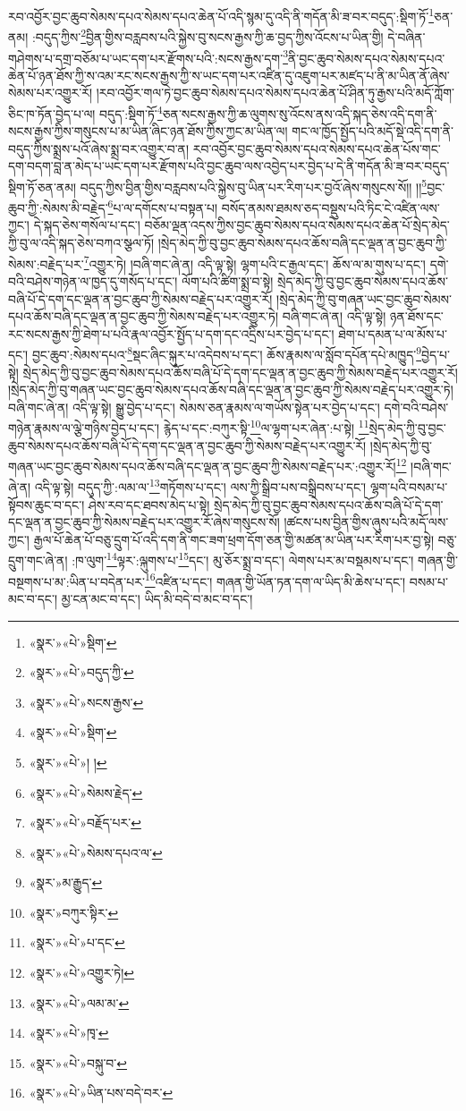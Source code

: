 རབ་འབྱོར་བྱང་ཆུབ་སེམས་དཔའ་སེམས་དཔའ་ཆེན་པོ་འདི་སྙམ་དུ་འདི་ནི་གདོན་མི་ཟ་བར་བདུད་:སྡིག་ཏོ་\footnote{«སྣར་»«པེ་»སྡིག་}ཅན་ནམ། :བདུད་ཀྱིས་\footnote{«སྣར་»«པེ་»བདུད་ཀྱི་}བྱིན་གྱིས་བརླབས་པའི་སྐྱེས་བུ་སངས་རྒྱས་ཀྱི་ཆ་བྱད་ཀྱིས་འོངས་པ་ཡིན་གྱི། དེ་བཞིན་གཤེགས་པ་དགྲ་བཅོམ་པ་ཡང་དག་པར་རྫོགས་པའི་:སངས་རྒྱས་དག་\footnote{«སྣར་»«པེ་»སངས་རྒྱས་}ནི་བྱང་ཆུབ་སེམས་དཔའ་སེམས་དཔའ་ཆེན་པོ་ཉན་ཐོས་ཀྱི་ས་འམ་རང་སངས་རྒྱས་ཀྱི་ས་ཡང་དག་པར་འཛིན་དུ་འཇུག་པར་མཛད་པ་ནི་མ་ཡིན་ནོ་ཞེས་སེམས་པར་འགྱུར་རོ། །རབ་འབྱོར་གལ་ཏེ་བྱང་ཆུབ་སེམས་དཔའ་སེམས་དཔའ་ཆེན་པོ་ཤིན་ཏུ་རྒྱས་པའི་མདོ་ཀློག་ཅིང་ཁ་ཏོན་བྱེད་པ་ལ། བདུད་:སྡིག་ཏོ་\footnote{«སྣར་»«པེ་»སྡིག་}ཅན་སངས་རྒྱས་ཀྱི་ཆ་ལུགས་སུ་འོངས་ནས་འདི་སྐད་ཅེས་འདི་དག་ནི་སངས་རྒྱས་ཀྱིས་གསུངས་པ་མ་ཡིན་ཞིང་ཉན་ཐོས་ཀྱིས་ཀྱང་མ་ཡིན་ལ། གང་ལ་ཁྱོད་སྤྱོད་པའི་མདོ་སྡེ་འདི་དག་ནི་བདུད་ཀྱིས་སྨྲས་པའོ་ཞེས་སྨྲ་བར་འགྱུར་བ་ན། རབ་འབྱོར་བྱང་ཆུབ་སེམས་དཔའ་སེམས་དཔའ་ཆེན་པོས་གང་དག་བདག་བླ་ན་མེད་པ་ཡང་དག་པར་རྫོགས་པའི་བྱང་ཆུབ་ལས་འབྱེད་པར་བྱེད་པ་དེ་ནི་གདོན་མི་ཟ་བར་བདུད་སྡིག་ཏོ་ཅན་ནམ། བདུད་ཀྱིས་བྱིན་གྱིས་བརླབས་པའི་སྐྱེས་བུ་ཡིན་པར་རིག་པར་བྱའོ་ཞེས་གསུངས་སོ།། །།\footnote{«སྣར་»«པེ་»། །}བྱང་ཆུབ་ཀྱི་:སེམས་མི་བརྗེད་\footnote{«སྣར་»«པེ་»སེམས་རྗེད་}པ་ལ་དགོངས་པ་བསྟན་པ། བསོད་ནམས་ཐམས་ཅད་བསྡུས་པའི་ཏིང་ངེ་འཛིན་ལས་ཀྱང་། དེ་སྐད་ཅེས་གསོལ་པ་དང་། བཅོམ་ལྡན་འདས་ཀྱིས་བྱང་ཆུབ་སེམས་དཔའ་སེམས་དཔའ་ཆེན་པོ་སྲེད་མེད་ཀྱི་བུ་ལ་འདི་སྐད་ཅེས་བཀའ་སྩལ་ཏོ། །སྲེད་མེད་ཀྱི་བུ་བྱང་ཆུབ་སེམས་དཔའ་ཆོས་བཞི་དང་ལྡན་ན་བྱང་ཆུབ་ཀྱི་སེམས་:བརྗེད་པར་\footnote{«སྣར་»«པེ་»བརྗོད་པར་}འགྱུར་ཏེ། །བཞི་གང་ཞེ་ན། འདི་ལྟ་སྟེ། ལྷག་པའི་ང་རྒྱལ་དང་། ཆོས་ལ་མ་གུས་པ་དང་། དགེ་བའི་བཤེས་གཉེན་ལ་ཁྱད་དུ་གསོད་པ་དང་། ལོག་པའི་ཚིག་སྨྲ་བ་སྟེ། སྲེད་མེད་ཀྱི་བུ་བྱང་ཆུབ་སེམས་དཔའ་ཆོས་བཞི་པོ་དེ་དག་དང་ལྡན་ན་བྱང་ཆུབ་ཀྱི་སེམས་བརྗེད་པར་འགྱུར་རོ། །སྲེད་མེད་ཀྱི་བུ་གཞན་ཡང་བྱང་ཆུབ་སེམས་དཔའ་ཆོས་བཞི་དང་ལྡན་ན་བྱང་ཆུབ་ཀྱི་སེམས་བརྗེད་པར་འགྱུར་ཏེ། བཞི་གང་ཞེ་ན། འདི་ལྟ་སྟེ། ཉན་ཐོས་དང་རང་སངས་རྒྱས་ཀྱི་ཐེག་པ་པའི་རྣལ་འབྱོར་སྤྱོད་པ་དག་དང་འདྲིས་པར་བྱེད་པ་དང་། ཐེག་པ་དམན་པ་ལ་མོས་པ་དང་། བྱང་ཆུབ་:སེམས་དཔའ་\footnote{«སྣར་»«པེ་»སེམས་དཔའ་ལ་}སྡང་ཞིང་སྐུར་པ་འདེབས་པ་དང་། ཆོས་རྣམས་ལ་སློབ་དཔོན་དཔེ་མཁྱུད་\footnote{«སྣར་»མ་རྒྱུད་}བྱེད་པ་སྟེ། སྲེད་མེད་ཀྱི་བུ་བྱང་ཆུབ་སེམས་དཔའ་ཆོས་བཞི་པོ་དེ་དག་དང་ལྡན་ན་བྱང་ཆུབ་ཀྱི་སེམས་བརྗེད་པར་འགྱུར་རོ། །སྲེད་མེད་ཀྱི་བུ་གཞན་ཡང་བྱང་ཆུབ་སེམས་དཔའ་ཆོས་བཞི་དང་ལྡན་ན་བྱང་ཆུབ་ཀྱི་སེམས་བརྗེད་པར་འགྱུར་ཏེ། བཞི་གང་ཞེ་ན། འདི་ལྟ་སྟེ། སྒྱུ་བྱེད་པ་དང་། སེམས་ཅན་རྣམས་ལ་གཡོས་སྟེན་པར་བྱེད་པ་དང་། དགེ་བའི་བཤེས་གཉེན་རྣམས་ལ་ལྕེ་གཉིས་བྱེད་པ་དང་། རྙེད་པ་དང་:བཀུར་སྟི་\footnote{«སྣར་»བཀུར་སྟིར་}ལ་ལྷག་པར་ཞེན་:པ་སྟེ། \footnote{«སྣར་»«པེ་»པ་དང་}སྲེད་མེད་ཀྱི་བུ་བྱང་ཆུབ་སེམས་དཔའ་ཆོས་བཞི་པོ་དེ་དག་དང་ལྡན་ན་བྱང་ཆུབ་ཀྱི་སེམས་བརྗེད་པར་འགྱུར་རོ། །སྲེད་མེད་ཀྱི་བུ་གཞན་ཡང་བྱང་ཆུབ་སེམས་དཔའ་ཆོས་བཞི་དང་ལྡན་ན་བྱང་ཆུབ་ཀྱི་སེམས་བརྗེད་པར་:འགྱུར་རོ།\footnote{«སྣར་»«པེ་»འགྱུར་ཏེ།} །བཞི་གང་ཞེ་ན། འདི་ལྟ་སྟེ། བདུད་ཀྱི་:ལམ་ལ་\footnote{«སྣར་»«པེ་»ལམ་མ་}གཏོགས་པ་དང་། ལས་ཀྱི་སྒྲིབ་པས་བསྒྲིབས་པ་དང་། ལྷག་པའི་བསམ་པ་སྟོབས་ཆུང་བ་དང་། ཤེས་རབ་དང་ཐབས་མེད་པ་སྟེ། སྲེད་མེད་ཀྱི་བུ་བྱང་ཆུབ་སེམས་དཔའ་ཆོས་བཞི་པོ་དེ་དག་དང་ལྡན་ན་བྱང་ཆུབ་ཀྱི་སེམས་བརྗེད་པར་འགྱུར་རོ་ཞེས་གསུངས་སོ། །ཚངས་པས་བྱིན་གྱིས་ཞུས་པའི་མདོ་ལས་ཀྱང་། རྒྱལ་པོ་ཆེན་པོ་བཅུ་དྲུག་པོ་འདི་དག་ནི་གང་ཟག་ཕྲག་དོག་ཅན་གྱི་མཚན་མ་ཡིན་པར་རིག་པར་བྱ་སྟེ། བཅུ་དྲུག་གང་ཞེ་ན། :ཁ་ལུག་\footnote{«སྣར་»«པེ་»ཁྭ་}ལྟར་:ལྐུགས་པ་\footnote{«སྣར་»«པེ་»བསྐུ་བ་}དང་། མུ་ཅོར་སྨྲ་བ་དང་། ལེགས་པར་མ་བསྡམས་པ་དང་། གཞན་གྱི་བསྔགས་པ་མ་:ཡིན་པ་བདེན་པར་\footnote{«སྣར་»«པེ་»ཡིན་པས་བདེ་བར་}འཛིན་པ་དང་། གཞན་གྱི་ཡོན་ཏན་དག་ལ་ཡིད་མི་ཆེས་པ་དང་། བསམ་པ་མང་བ་དང་། མྱ་ངན་མང་བ་དང་། ཡིད་མི་བདེ་བ་མང་བ་དང་། 